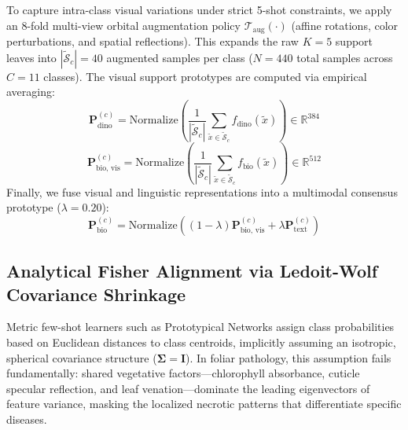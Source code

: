 \documentclass[conference]{IEEEtran}
\begin{document}
To capture intra-class visual variations under strict 5-shot constraints, we apply an 8-fold multi-view orbital augmentation policy $\mathcal{T}_{\text{aug}}(\cdot)$ (affine rotations, color perturbations, and spatial reflections). This expands the raw $K=5$ support leaves into $|\tilde{\mathcal{S}}_c| = 40$ augmented samples per class ($N = 440$ total samples across $C = 11$ classes). The visual support prototypes are computed via empirical averaging:
\begin{equation}
\mathbf{P}_{\text{dino}}^{(c)} = \text{Normalize}\left(\frac{1}{|\tilde{\mathcal{S}}_c|}\sum_{\tilde{x} \in \tilde{\mathcal{S}}_c} f_{\text{dino}}(\tilde{x})\right) \in \mathbb{R}^{384}
\end{equation}
\begin{equation}
\mathbf{P}_{\text{bio, vis}}^{(c)} = \text{Normalize}\left(\frac{1}{|\tilde{\mathcal{S}}_c|}\sum_{\tilde{x} \in \tilde{\mathcal{S}}_c} f_{\text{bio}}(\tilde{x})\right) \in \mathbb{R}^{512}
\end{equation}
Finally, we fuse visual and linguistic representations into a multimodal consensus prototype ($\lambda = 0.20$):
\begin{equation}
\mathbf{P}_{\text{bio}}^{(c)} = \text{Normalize}\left((1-\lambda)\mathbf{P}_{\text{bio, vis}}^{(c)} + \lambda \mathbf{P}_{\text{text}}^{(c)}\right)
\end{equation}

\subsection{Analytical Fisher Alignment via Ledoit-Wolf Covariance Shrinkage}
\label{sec:fisher_alignment}

Metric few-shot learners such as Prototypical Networks \cite{snell2017prototypical} assign class probabilities based on Euclidean distances to class centroids, implicitly assuming an isotropic, spherical covariance structure ($\mathbf{\Sigma} = \mathbf{I}$). In foliar pathology, this assumption fails fundamentally: shared vegetative factors---chlorophyll absorbance, cuticle specular reflection, and leaf venation---dominate the leading eigenvectors of feature variance, masking the localized necrotic patterns that differentiate specific diseases.
\end{document}
